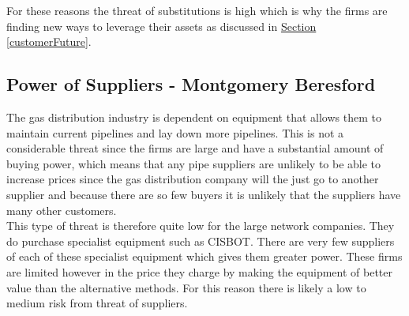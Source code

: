 \documentclass[11pt]{article}		%
\newcommand{\supercite}[1]{\textsuperscript{\cite{#1}}}		%
\newcommand{\sectref}[1]{\hyperref[#1]{Section \ref*{#1}}}     %
\begin{document}
                For these reasons the threat of substitutions is high which is why the firms are finding new ways to leverage their assets as discussed in \sectref{customerFuture}.%

     
		\subsection[Power of Suppliers]{Power of Suppliers - Montgomery Beresford}
		        The gas distribution industry is dependent on equipment that allows them to maintain current pipelines and lay down more pipelines. 
		        This is not a considerable threat since the firms are large and have a substantial amount of buying power, which means that any pipe suppliers are unlikely to be able to increase prices since the gas distribution company will the just go to another supplier and because there are so few buyers it is unlikely that the suppliers have many other customers. 
		        \\ \hspace*{3ex}
		        This type of threat is therefore quite low for the large network companies.
                They do purchase specialist equipment such as CISBOT. There are very few suppliers of each of these specialist equipment which gives them greater power. These firms are limited however in the price they charge by making the equipment of better value than the alternative methods.
                For this reason there is likely a low to medium risk from threat of suppliers.

		
\end{document}
